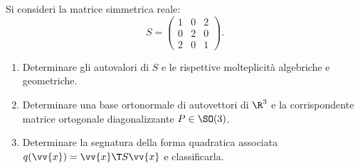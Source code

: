 \begin{tcolorbox}[colback=white, colframe=navyblue, title={\textbf{Testo del Problema 3 — Matrice Simmetrica, Teorema Spettrale e Forme Quadratiche}}]
Si consideri la matrice simmetrica reale:
\begin{equation}
    S = \begin{pmatrix}
        1 & 0 & 2 \\
        0 & 2 & 0 \\
        2 & 0 & 1
    \end{pmatrix}.
\end{equation}
\begin{enumerate}[label=(\roman*)]
    \item Determinare gli autovalori di $S$ e le rispettive molteplicità algebriche e geometriche.
    \item Determinare una base ortonormale di autovettori di $\R^3$ e la corrispondente matrice ortogonale diagonalizzante $P \in \SO(3)$.
    \item Determinare la segnatura della forma quadratica associata $q(\vv{x}) = \vv{x}\T S \vv{x}$ e classificarla.
\end{enumerate}
\end{tcolorbox}

